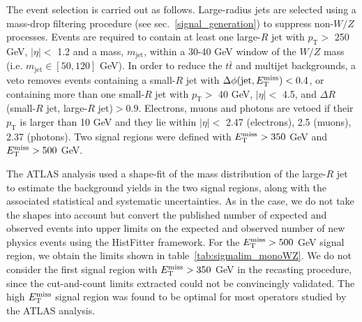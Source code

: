 The \monoWZ event selection is carried out as follows. Large-radius jets are selected using a mass-drop filtering procedure (see sec.~\ref{signal_generation}) to suppress non-$W/Z$ processes. Events are required to contain at least one large-$R$ jet with $p_{\mathrm{T}} >$ 250 GeV, $|\eta| <$ 1.2 and a mass, $m_{\mathrm{jet}}$, within a 30-40 GeV window of the $W/Z$ mass (i.e. $m_{\mathrm{jet}} \in [50, 120]$ GeV). In order to reduce the $t \bar{t}$ and multijet backgrounds, a veto removes events containing a small-$R$ jet with $\Delta\phi(\mathrm{jet},E_{\mathrm{T}}^{\mathrm{miss}})< 0.4$, or containing more than one small-$R$ jet with $p_{\mathrm{T}} >$ 40 GeV, $|\eta| <$ 4.5, and $\Delta R$(small-$R$ jet, large-$R$ jet)$>0.9$. Electrons, muons and photons are vetoed if their $p_{\mathrm{T}}$ is larger than 10 GeV and they lie within $|\eta| <$ 2.47 (electrons), 2.5 (muons), 2.37 (photons). Two signal regions were defined with $E_{\mathrm{T}}^{\mathrm{miss}} > 350$ GeV and $E_{\mathrm{T}}^{\mathrm{miss}} > 500$ GeV.


The ATLAS analysis used a shape-fit of the mass distribution of the large-$R$ jet to estimate the background yields in the two signal regions, along with the associated statistical and systematic uncertainties. As in the \monoZ case, we do not take the shapes into account but convert the published number of expected and observed events into upper limits on the expected and observed number of new physics events using the HistFitter framework. For the $E_{\mathrm{T}}^{\mathrm{miss}} > 500$ GeV signal region, we obtain the limits shown in table~\ref{tab:sigmalim_monoWZ}. We do not consider the first signal region with $E_{\mathrm{T}}^{\mathrm{miss}} > 350$ GeV in the recasting procedure, since the cut-and-count limits extracted could not be convincingly validated. The high $E_{\mathrm{T}}^{\mathrm{miss}}$ signal region was found to be optimal for most operators studied by the ATLAS analysis.

